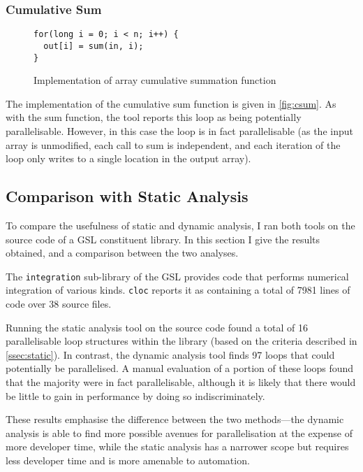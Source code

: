 \documentclass[journal]{IEEEtran}
\begin{document}
\subsubsection{Cumulative Sum}

\begin{figure}[h]
  \centering
  \begin{lstlisting}
for(long i = 0; i < n; i++) {
  out[i] = sum(in, i);
}
  \end{lstlisting}
  \caption{Implementation of array cumulative summation function}
  \label{fig:csum}
\end{figure}

The implementation of the cumulative sum function is given in
\autoref{fig:csum}. As with the sum function, the tool reports this loop as
being potentially parallelisable. However, in this case the loop is in fact
parallelisable (as the input array is unmodified, each call to sum is
independent, and each iteration of the loop only writes to a single location in
the output array).

\subsection{Comparison with Static Analysis} \label{ssec:compare}

To compare the usefulness of static and dynamic analysis, I ran both tools on
the source code of a GSL constituent library. In this section I give the results
obtained, and a comparison between the two analyses.

The \texttt{integration} sub-library of the GSL provides code that performs
numerical integration of various kinds. \texttt{cloc} reports it as containing a
total of 7981 lines of code over 38 source files.

Running the static analysis tool on the source code found a total of 16
parallelisable loop structures within the library (based on the criteria
described in \autoref{ssec:static}). In contrast, the dynamic analysis tool
finds 97 loops that could potentially be parallelised. A manual evaluation of a
portion of these loops found that the majority were in fact parallelisable,
although it is likely that there would be little to gain in performance by doing
so indiscriminately.

These results emphasise the difference between the two methods---the dynamic
analysis is able to find more possible avenues for parallelisation at the
expense of more developer time, while the static analysis has a narrower scope
but requires less developer time and is more amenable to automation.
\end{document}
